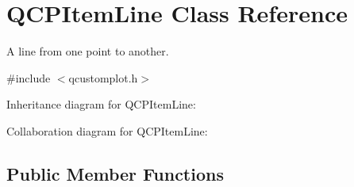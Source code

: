 \hypertarget{class_q_c_p_item_line}{}\section{Q\+C\+P\+Item\+Line Class Reference}
\label{class_q_c_p_item_line}


A line from one point to another.  




{\ttfamily \#include $<$qcustomplot.\+h$>$}



Inheritance diagram for Q\+C\+P\+Item\+Line\+:


Collaboration diagram for Q\+C\+P\+Item\+Line\+:
\subsection*{Public Member Functions}
